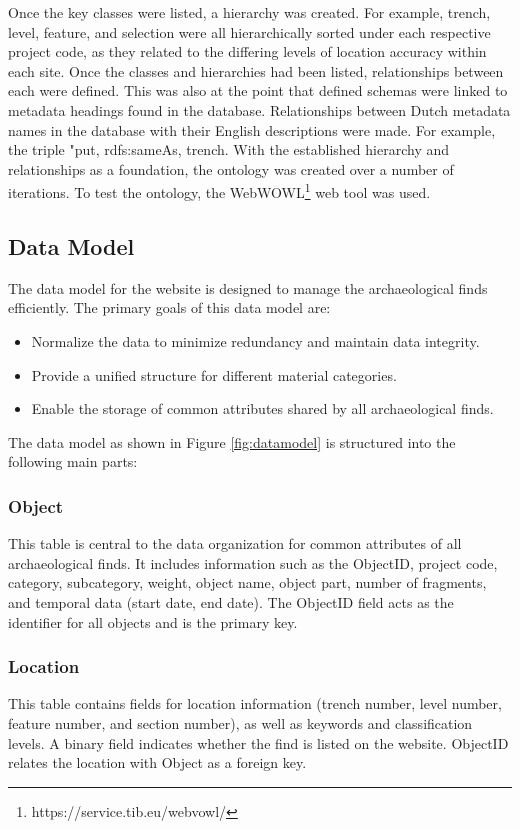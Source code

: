 Once the key classes were listed, a hierarchy was created. For example, trench, level, feature, and selection were all hierarchically sorted under each respective project code, as they related to the differing levels of location accuracy within each site. Once the classes and hierarchies had been listed, relationships between each were defined.  This was also at the point that defined schemas were linked to metadata headings found in the database. Relationships between Dutch metadata names in the database with their English descriptions were made. For example, the triple "put, rdfs:sameAs, trench.  With the established hierarchy and relationships as a foundation, the ontology was created over a number of iterations. To test the ontology, the WebWOWL\footnote{https://service.tib.eu/webvowl/} web tool was used.

\subsection{Data Model}

The data model for the website is designed to manage the archaeological finds efficiently. The primary goals of this data model are:

\begin{itemize}
\item Normalize the data to minimize redundancy and maintain data integrity.
\item Provide a unified structure for different material categories.
\item Enable the storage of common attributes shared by all archaeological finds.
\end{itemize}

The data model as shown in Figure \ref{fig:datamodel} is structured into the following main parts:

\subsubsection{Object}
This table is central to the data organization for common attributes of all archaeological finds. It includes information such as the ObjectID, project code, category, subcategory, weight, object name, object part, number of fragments, and temporal data (start date, end date). The ObjectID field acts as the identifier for all objects and is the primary key.

\subsubsection{Location}
This table contains fields for location information (trench number, level number, feature number, and section number), as well as keywords and classification levels. A binary field indicates whether the find is listed on the website. ObjectID relates the location with Object as a foreign key.

